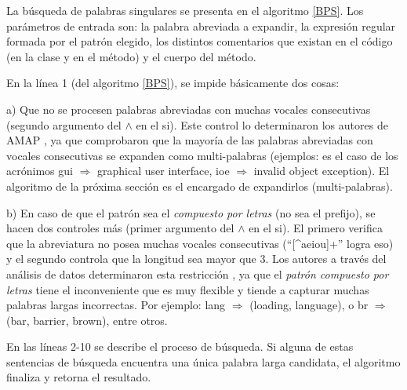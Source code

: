 La búsqueda de palabras singulares se presenta en el algoritmo \ref{BPS}. Los parámetros de entrada son: la palabra abreviada a expandir, la expresión regular formada por el patrón elegido, los distintos comentarios que existan en el código (en la clase y en el método) y el cuerpo del método.

En la línea 1 (del algoritmo \ref{BPS}), se impide básicamente dos cosas: 

a) Que no se procesen palabras abreviadas con muchas vocales consecutivas (segundo argumento del $\land$ en el \textsf{si}). Este control lo determinaron los autores de AMAP \cite{EZH08}, ya que comprobaron que la mayoría de las palabras abreviadas con vocales consecutivas se expanden como multi-palabras (ejemplos: es el caso de los acrónimos \textsf{gui} $\Rightarrow$ \textsf{graphical user interface}, \textsf{ioe} $\Rightarrow$ \textsf{invalid object exception}). El algoritmo de la próxima sección es el encargado de expandirlos (multi-palabras).

b) En caso de que el patrón sea el \textit{compuesto por letras} (no sea el prefijo), se hacen dos controles más (primer argumento del $\land$ en el \textsf{si}). El primero verifica que la abreviatura no posea muchas vocales consecutivas (“[\^{}aeiou]+” logra eso) y el segundo controla que la longitud sea mayor que 3. Los autores a través del análisis de datos determinaron esta restricción \cite{EZH08}, ya que el \textit{patrón compuesto por letras} tiene el inconveniente que es muy flexible y tiende a capturar muchas palabras largas incorrectas. Por ejemplo: \textsf{lang} $\Rightarrow$ (\textsf{loading}, \textsf{language}), o \textsf{br} $\Rightarrow$ (\textsf{bar}, \textsf{barrier}, \textsf{brown}), entre otros.

En las líneas 2-10 se describe el proceso de búsqueda. Si alguna de estas sentencias de búsqueda encuentra una única palabra larga candidata, el algoritmo finaliza y retorna el resultado. 

